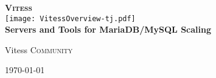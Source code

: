 \begin{titlepage}
 
\begin{center}

\textsc{\huge \bfseries Vitess}\\[2.5cm] 
\texttt{[image: VitessOverview-tj.pdf]}\\[1cm]
  

{ \large  \bfseries Servers and Tools for MariaDB/MySQL Scaling}
\\[1.0cm]
 
 
\begin{minipage}{0.4\textwidth}
\begin{center} \large
Vitess \textsc{Community}
\end{center}
\end{minipage}
 
\vfill
{\large \today}
 
\end{center}
 
\end{titlepage}

